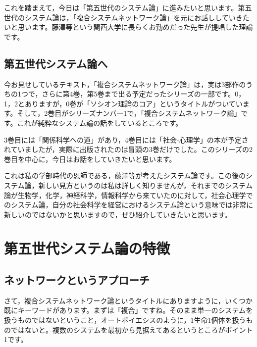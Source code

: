 \documentclass{ltjsbook}
\begin{document}
これを踏まえて，今日は「第五世代のシステム論」に進みたいと思います。第五世代のシステム論は，「複合システムネットワーク論」を元にお話ししていきたいと思います。藤澤等という関西大学に長らくお勤めだった先生が提唱した理論です。

\subsection{第五世代システム論へ}

今お見せしているテキスト，「複合システムネットワーク論」\parencite{fujisawaNetwork}は，実は3部作のうちの1つで，さらに第4巻，第5巻まで出る予定だったシリーズの一部です。0，1，2とありますが，0巻が「ソシオン理論のコア」\parencite{fujisawaCore}というタイトルがついています。そして，2巻目がシリーズナンバー1で，「複合システムネットワーク論」\parencite{fujisawaNetwork}です。これが純粋なシステム論の話をしているところです。

3巻目には「関係科学への道」があり\parencite{fujisawaRelationships}，4巻目には「社会-心理学」の本が予定されていましたが，実際に出版されたのは冒頭の3巻だけでした。このシリーズの2巻目を中心に，今日はお話をしていきたいと思います。

これは私の学部時代の恩師である，藤澤等が考えたシステム論です。この後のシステム論，新しい見方というのは私は詳しく知りませんが，それまでのシステム論が生物学，化学，神経科学，情報科学から来ていたのに対して，社会心理学でのシステム論，自分の社会科学を経営におけるシステム論という意味では非常に新しいのではないかと思いますので，ぜひ紹介していきたいと思います。


\section{第五世代システム論の特徴}
\subsection{ネットワークというアプローチ}

さて，複合システムネットワーク論というタイトルにありますように，いくつか既にキーワードがあります。まずは「複合」ですね。そのまま単一のシステムを扱うものではないということ，オートポイエシスのように，1生命1個体を扱うものではないと。複数のシステムを最初から見据えてあるというところがポイント1です。
\end{document}
